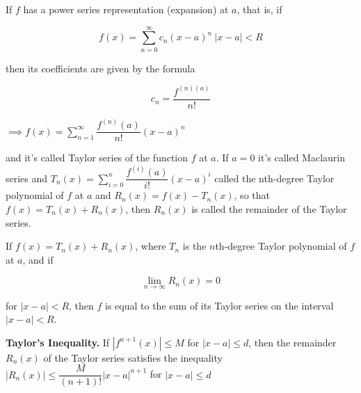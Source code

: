 \begin{defn}
	If $f$ has a power series representation (expansion) at $a$, that is, if 
	
	$$f(x) = \sum^{\infty}_{n = 0}c_n(x-a)^n~|x - a| < R$$
	
	then its coefficients are given by the formula
	
	$$c_n = \dfrac{f^{(n)(a)}}{n!}$$
	
	$\implies f(x) = \sum^{\infty}_{n = 1}\dfrac{f^{(n)}(a)}{n!}(x-a)^n$
	
	and it's called Taylor series of the function $f$ at $a$. If $a = 0$ it's called Maclaurin series and $T_n(x) = \sum^{n}_{i=0}\dfrac{f^{(i)}(a)}{i!}(x-a)^i$ called the nth-degree Taylor polynomial of $f$ at $a$ and $R_n(x) = f(x) - T_n(x)$, so that $f(x) = T_n(x) + R_n (x)$, then $R_n(x)$ is called the remainder of the Taylor series.	
\end{defn}


\begin{thm*}
	If $f(x) = T_n(x) + R_n(x)$, where $T_n$ is the $n$th-degree Taylor polynomial of $f$ at $a$, and if
	
	$$\lim_{n \rightarrow \infty}R_n(x) = 0$$
	
	for $|x-a| < R$, then $f$ is equal to the sum of its Taylor series on the interval $|x - a| < R$.	
\end{thm*}

\textbf{Taylor's Inequality.} If $|f^{n+1}(x)| \leq M$ for $|x-a| \leq d$, then the remainder $R_n(x)$ of the Taylor series satisfies the inequality $|R_n(x)| \leq \dfrac{M}{(n+1)!}|x-a|^{n+1}$ for $|x-a| \leq d$

































